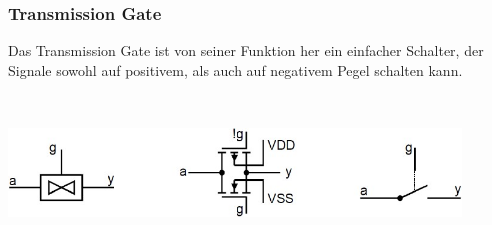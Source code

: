 	\subsubsection{Transmission Gate}
		\begin{minipage}{10 cm}
			Das Transmission Gate ist von seiner Funktion her ein einfacher Schalter, der Signale sowohl auf positivem, als auch auf negativem Pegel schalten kann.
		\end{minipage}
		\begin{minipage}{0.5 cm}
			\ 
		\end{minipage}
		\begin{minipage}{8 cm}
			\includegraphics[width=0.9\textwidth]{pics/transmissiongate}
		\end{minipage}
		
